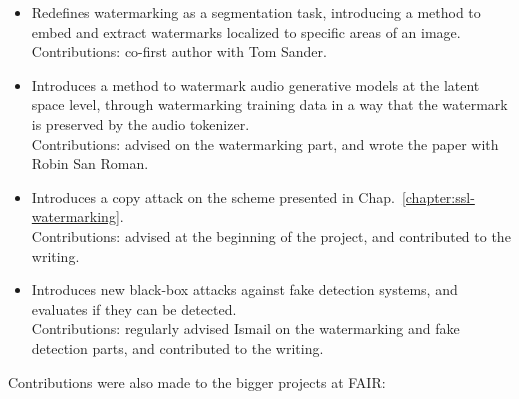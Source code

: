 {\footnotesize
{}
\begin{itemize}
    \item {} 
    \begin{spacing}{1.0}
        \scriptsize Redefines watermarking as a segmentation task, introducing a method to embed and extract watermarks localized to specific areas of an image. \\
        \scriptsize Contributions: co-first author with Tom Sander.
    \end{spacing}
    \item {} 
    \begin{spacing}{1.0}
        \scriptsize Introduces a method to watermark audio generative models at the latent space level, through watermarking training data in a way that the watermark is preserved by the audio tokenizer. \\
        \scriptsize Contributions: advised on the watermarking part, and wrote the paper with Robin San Roman.
    \end{spacing}
    \item {} 
    \begin{spacing}{1.0}
        \scriptsize Introduces a copy attack on the scheme presented in Chap.~\ref{chapter:ssl-watermarking}. \\
        \scriptsize Contributions: advised at the beginning of the project, and contributed to the writing.
    \end{spacing}
    \item {} 
    \begin{spacing}{1.0}
        \scriptsize Introduces new black-box attacks against fake detection systems, and evaluates if they can be detected. \\
        \scriptsize Contributions: regularly advised Ismail on the watermarking and fake detection parts, and contributed to the writing.
    \end{spacing}
\end{itemize}
}


\noindent
Contributions were also made to the bigger projects at FAIR:

